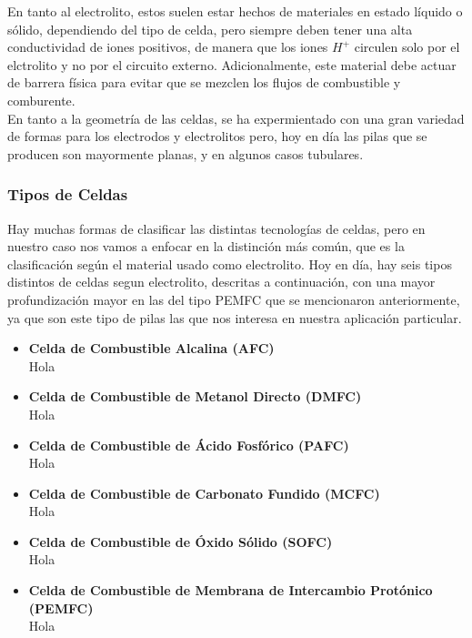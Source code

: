 En tanto al electrolito, estos suelen estar hechos de materiales en estado líquido o sólido, dependiendo del tipo de celda, pero siempre deben tener una alta conductividad de iones positivos, de manera que los iones $H^{+}$ circulen solo por el elctrolito y no por el circuito externo. Adicionalmente, este material debe actuar de barrera física para evitar que se mezclen los flujos de combustible y comburente.\\

En tanto a la geometría de las celdas, se ha expermientado con una gran variedad de formas para los electrodos y electrolitos pero, hoy en día las pilas que se producen son mayormente planas, y en algunos casos tubulares.\\

\subsubsection{Tipos de Celdas}

Hay muchas formas de clasificar las distintas tecnologías de celdas, pero en nuestro caso nos vamos a enfocar en la distinción más común, que es la clasificación según el material usado como electrolito. Hoy en día, hay seis tipos distintos de celdas segun electrolito, descritas a continuación, con una mayor profundización mayor en las del tipo PEMFC que se mencionaron anteriormente, ya que son este tipo de pilas las que nos interesa en nuestra aplicación particular.

\begin{itemize}
    \item \textbf{Celda de Combustible Alcalina (AFC)}\\
    Hola
    \item \textbf{Celda de Combustible de Metanol Directo (DMFC)}\\
    Hola
    \item \textbf{Celda de Combustible de Ácido Fosfórico (PAFC)}\\
    Hola
    \item \textbf{Celda de Combustible de Carbonato Fundido (MCFC)}\\
    Hola
    \item \textbf{Celda de Combustible de Óxido Sólido (SOFC)}\\
    Hola
    \item \textbf{Celda de Combustible de Membrana de Intercambio Protónico (PEMFC)}\\
    Hola
\end{itemize}